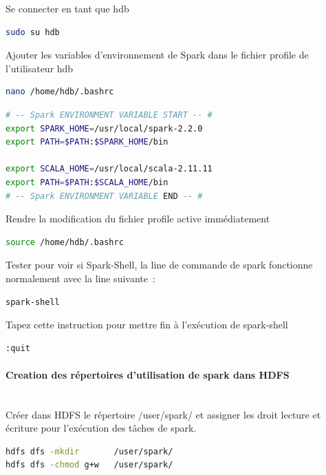 \documentclass[12pt,english]{book}
\begin{document}
Se connecter en tant que hdb

\begin{lstlisting}[language=bash, frame=single]
sudo su hdb
\end{lstlisting}

Ajouter les variables d’environnement de Spark dans le fichier profile de l’utilisateur hdb

\begin{lstlisting}[language=bash, frame=single]
nano /home/hdb/.bashrc
\end{lstlisting}

\begin{lstlisting}[language=bash, frame=single]
# -- Spark ENVIRONMENT VARIABLE START -- #
export SPARK_HOME=/usr/local/spark-2.2.0
export PATH=$PATH:$SPARK_HOME/bin

export SCALA_HOME=/usr/local/scala-2.11.11
export PATH=$PATH:$SCALA_HOME/bin
# -- Spark ENVIRONMENT VARIABLE END -- #
\end{lstlisting}

Rendre la modification du fichier profile active immédiatement

\begin{lstlisting}[language=bash, frame=single]
source /home/hdb/.bashrc
\end{lstlisting}

Tester pour voir si Spark-Shell, la line de commande de spark fonctionne normalement avec la line suivante :

\begin{lstlisting}[language=bash, frame=single]
spark-shell
\end{lstlisting}

Tapez cette instruction pour mettre fin à l'exécution de spark-shell

\begin{lstlisting}[language=bash, frame=single]
:quit
\end{lstlisting}

\paragraph{Creation des répertoires d’utilisation de spark dans HDFS}\mbox{}\\

Créer dans HDFS le répertoire /user/spark/ et assigner les droit lecture et écriture pour l’exécution des tâches de spark. 

\begin{lstlisting}[language=bash, frame=single]
hdfs dfs -mkdir       /user/spark/
hdfs dfs -chmod g+w   /user/spark/
\end{lstlisting}
\end{document}
